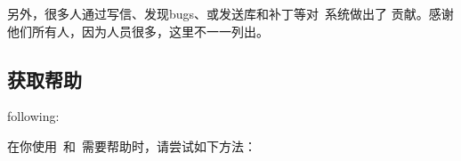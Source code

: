 
另外，很多人通过写信、发现bugs、或发送库和补丁等对\pgfname\ 系统做出了
贡献。感谢他们所有人，因为人员很多，这里不一一列出。


\subsection{获取帮助}

following:

在你使用\pgfname\ 和\tikzname\ 需要帮助时，请尝试如下方法：


